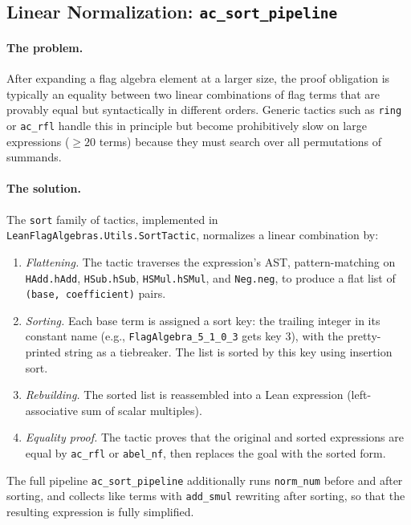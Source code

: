 \documentclass{article}
\newcommand{\lean}[1]{\texttt{#1}}
\begin{document}
\subsection{Linear Normalization: \lean{ac\_sort\_pipeline}}

\paragraph{The problem.}
After expanding a flag algebra element at a larger size, the proof obligation
is typically an equality between two linear combinations of flag terms that are
provably equal but syntactically in different orders.  Generic tactics such as
\lean{ring} or \lean{ac\_rfl} handle this in principle but become prohibitively
slow on large expressions ($\geq 20$ terms) because they must search over all
permutations of summands.

\paragraph{The solution.}
The \lean{sort} family of tactics, implemented in
\lean{LeanFlagAlgebras.Utils.SortTactic}, normalizes a linear
combination by:
\begin{enumerate}
  \item \emph{Flattening.}  The tactic traverses the expression's AST,
    pattern-matching on \lean{HAdd.hAdd}, \lean{HSub.hSub},
    \lean{HSMul.hSMul}, and \lean{Neg.neg}, to produce a flat list of
    \lean{(base, coefficient)} pairs.
  \item \emph{Sorting.}  Each base term is assigned a sort key: the trailing
    integer in its constant name (e.g., \lean{FlagAlgebra\_5\_1\_0\_3} gets
    key $3$), with the pretty-printed string as a tiebreaker.  The list is
    sorted by this key using insertion sort.
  \item \emph{Rebuilding.}  The sorted list is reassembled into a Lean
    expression (left-associative sum of scalar multiples).
  \item \emph{Equality proof.}  The tactic proves that the original and sorted
    expressions are equal by \lean{ac\_rfl} or \lean{abel\_nf}, then replaces
    the goal with the sorted form.
\end{enumerate}
The full pipeline \lean{ac\_sort\_pipeline} additionally runs \lean{norm\_num}
before and after sorting, and collects like terms with
\lean{add\_smul} rewriting after sorting, so that the resulting expression is
fully simplified.
\end{document}
